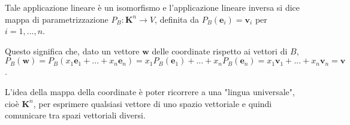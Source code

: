 \documentclass{article}
\begin{document}
Tale applicazione lineare \`{e} un isomorfismo e l'applicazione lineare
inversa si dice mappa di parametrizzazione $P_{B}:\mathbf{K}^{n}\rightarrow
V $, definita da $P_{B}\left( \mathbf{e}_{i}\right) =\mathbf{v}_{i}$ per $%
i=1,...,n$.

Questo significa che, dato un vettore $\mathbf{w}$ delle coordinate rispetto
ai vettori di $B$, $P_{B}\left( \mathbf{w}\right) =P_{B}\left( x_{1}\mathbf{e%
}_{1}+...+x_{n}\mathbf{e}_{n}\right) =x_{1}P_{B}\left( \mathbf{e}_{1}\right)
+...+x_{n}P_{B}\left( \mathbf{e}_{n}\right) =x_{1}\mathbf{v}_{1}+...+x_{n}%
\mathbf{v}_{n}=\mathbf{v}$.

L'idea della mappa della coordinate \`{e} poter ricorrere a una "lingua
universale", cio\`{e} $\mathbf{K}^{n}$, per esprimere qualsiasi vettore di
uno spazio vettoriale e quindi comunicare tra spazi vettoriali diversi.
\end{document}
